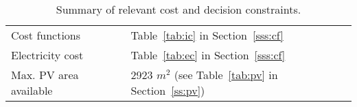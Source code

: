 \begin{table}[htp]
	\centering
	\caption{Summary of relevant cost and decision constraints.}
	\label{tab:cc}
	\begin{tabular}{ll}
		\toprule
		Cost functions         & Table~\ref{tab:ic} in Section~\ref{sss:cf}         \\
		Electricity cost       & Table~\ref{tab:ec} in Section~\ref{sss:cf}       \\
		Max. PV area available & 2923 $m^2$ (see Table~\ref{tab:pv} in Section~\ref{ss:pv})\\ 
		\bottomrule
	\end{tabular}
\end{table}